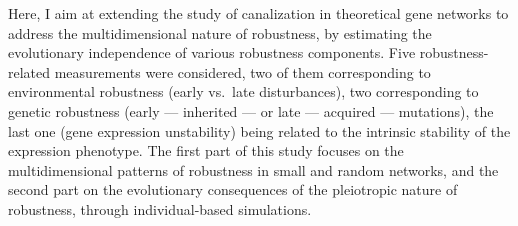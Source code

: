 \documentclass[10pt,a4paper]{article}
\begin{document}
Here, I aim at extending the study of canalization in theoretical gene networks to address the multidimensional nature of robustness, by estimating the evolutionary independence of various robustness components. Five robustness-related measurements were considered, two of them corresponding to environmental robustness (early vs.\ late disturbances), two corresponding to genetic robustness (early --- inherited --- or late --- acquired --- mutations), the last one (gene expression unstability) being related to the intrinsic stability of the expression phenotype. The first part of this study focuses on the multidimensional patterns of robustness in small and random networks, and the second part on the evolutionary consequences of the pleiotropic nature of robustness, through individual-based simulations. 


















\end{document}
